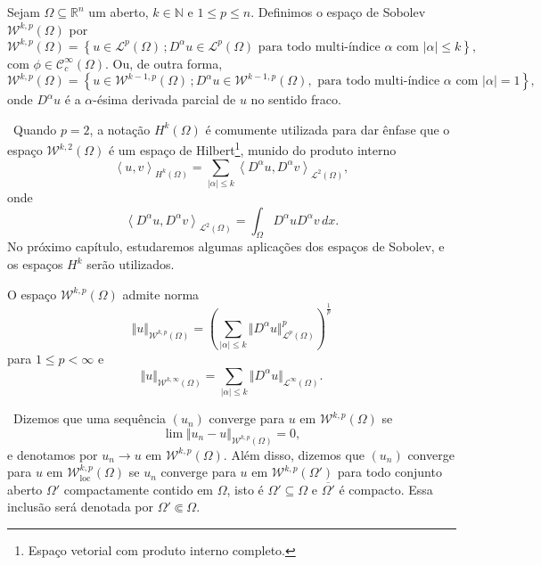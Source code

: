 \documentclass[a4paper, 11pt]{book}
\theoremstyle{definition}
\newcommand{\obs}{\noindent{\textbf{\textcolor{black}{\sffamily Observação:}}}~}
\newcommand{\bN}{\mathbb{N}}
\newcommand{\bR}{\mathbb{R}}
\newcommand{\cC}{\mathcal{C}}
\newcommand{\cL}{\mathcal{L}}
\newcommand{\cW}{\mathcal{W}}
\newcommand{\esssup}{\mathrm{ess\,sup}\,}
\newcommand{\loc}{\mathrm{loc}}
\begin{document}
\begin{dbox}
    Sejam $\Omega \subseteq \bR ^n$ um aberto, $k \in \bN$ e $1 \leqslant p \leqslant n$. Definimos o espaço de Sobolev $\cW^{k,p}(\Omega)$ por
    \[
        \cW^{k,p}(\Omega) = \left\{ u \in \cL^p(\Omega) \,; D^\alpha u \in \cL^p(\Omega) \text{ para todo multi-índice } \alpha \text{ com } |\alpha| \leqslant k\right\},
    \]
    com $\phi \in \cC^\infty_c(\Omega)$. 
    Ou, de outra forma,
    \[
        \cW^{k,p}(\Omega) = \left\{ u \in \cW^{k-1,p}(\Omega) \,; D^\alpha u \in \cW^{k-1,p}(\Omega) , \text{ para todo multi-índice } \alpha \text{ com } |\alpha| = 1\right\},
    \]
    onde $D^\alpha u$ é a $\alpha$-ésima derivada parcial de $u$ no sentido fraco.
\end{dbox}

\obs Quando $p = 2$, a notação $H^{k}(\Omega)$ é comumente utilizada para dar ênfase que o espaço $\cW^{k,2}(\Omega)$ é um espaço de Hilbert\footnote{Espaço vetorial com produto interno completo.}, munido do produto interno
\[
    \left\langle u, v\right\rangle _{H^k(\Omega)} = \sum_{|\alpha| \leqslant k} \left\langle D^\alpha u, D^\alpha v\right\rangle _{\cL^2(\Omega)},
\]
onde
\[
    \left\langle D^\alpha u, D^\alpha v\right\rangle _{\cL^2(\Omega)} = \int_\Omega D^\alpha u D^\alpha v \,dx.
\]
No próximo capítulo, estudaremos algumas aplicações dos espaços de Sobolev, e os espaços $H^k$ serão utilizados.

\begin{dbox}
    O espaço $\cW^{k,p}(\Omega)$ admite norma
    \[
        \Vert u \Vert_{\cW^{k,p}(\Omega)} = \left( \sum_{|\alpha| \leqslant k} \Vert D^\alpha u \Vert_{\cL^p(\Omega)}^p \right)^{\frac{1}{p}}
    \]
    para $1 \leqslant p < \infty$ e 
    \[
        \Vert u \Vert_{\cW^{k,\infty}(\Omega)} 
        = \sum_{|\alpha| \leqslant k} \Vert D^{\alpha}u \Vert_{\cL^\infty(\Omega)}.
    \]
\end{dbox}

\obs Dizemos que uma sequência $(u_n)$ converge para $u$ em $\cW^{k,p}(\Omega)$ se
\[
    \lim \Vert u_n - u \Vert_{\cW^{k,p}(\Omega)} = 0,
\]
e denotamos por $u_n \to u \text{ em } \cW^{k,p}(\Omega)$.
Além disso, dizemos que $(u_n)$ converge para $u$ em $\cW^{k,p}_\loc(\Omega)$ se $u_n$ converge para $u$ em $\cW^{k,p}(\Omega')$ para todo conjunto aberto $\Omega'$ compactamente contido em $\Omega$, isto é $\Omega' \subseteq \Omega$ e $\overline{\Omega'}$ é compacto. Essa inclusão será denotada por $\Omega' \Subset \Omega$.
\end{document}
